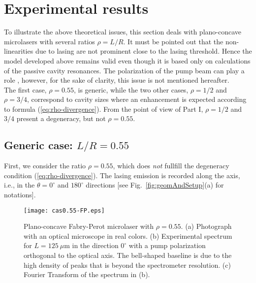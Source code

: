 \documentclass[10pt]{iopart}
\begin{document}
\section{Experimental results} \label{sec:experiences}

To illustrate the above theoretical issues, this section deals with plano-concave microlasers with several ratios $\rho = L / R$. It must be pointed out that the non-linearities due to lasing are not prominent close to the lasing threshold. Hence the model developed above remains valid even though it is based only on calculations of the passive cavity resonances. The polarization of the pump beam can play a role \cite{PRA-polarisation}, however, for the sake of clarity, this issue is not mentioned hereafter. \\

The first case, $\rho = 0.55$, is generic, while the two other cases, $\rho = 1/2$ and $\rho = 3/4$, correspond to cavity sizes where an enhancement is expected according to formula (\ref{eq:rho-divergence}). From the point of view of Part I, $\rho = 1/2$ and $3 / 4$ present a degeneracy, but not $\rho = 0.55$.


\subsection{Generic case: $L/R=0.55$}\label{sec:exp-0.55}

First, we consider the ratio $\rho = 0.55$, which does \emph{not} fullfill the degeneracy condition (\ref{eq:rho-divergence}). The lasing emission is recorded along the axis, i.e., in the $\theta = 0^{\circ}$ and $180^{\circ}$ directions [see Fig.~\ref{fig:geomAndSetup}(a) for notations].

\begin{figure}
\begin{center}
\texttt{[image: cas0.55-FP.eps]}
\end{center}
\caption{Plano-concave Fabry-Perot microlaser with $\rho = 0.55$. (a) Photograph with an optical microscope in real colors. (b) Experimental spectrum for $L = 125~\mu$m in the direction $0^{\circ}$ with a pump polarization orthogonal to the optical axis. The bell-shaped baseline is due to the high density of peaks that is beyond the spectrometer resolution. (c) Fourier Transform of the spectrum in (b).}
\label{fig:photo-0.55}
\end{figure}
\end{document}
